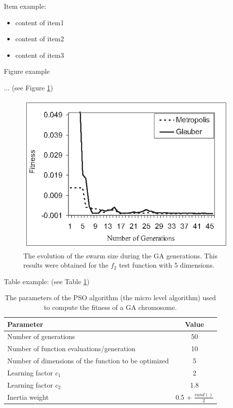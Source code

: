 \documentclass[runningheads,a4paper,11pt]{report}
\begin{document}
Item example: 

\begin{itemize}
	\item content of item1
 	\item content of item2
 	\item content of item3
\end{itemize}



Figure example 

$\ldots$ (see Figure \ref{swarmsize})

\begin{figure}[htbp]
	\centerline{\includegraphics{Fig/FitEvol.eps}}  
	\caption{The evolution of the swarm size during the GA generations. This results were obtained for the $f_2$ test function with 5 dimensions.}
	\label{swarmsize}
\end{figure}


Table example: (see Table \ref{tab3PSO})


\begin{table}[htbp]
	\caption{The parameters of the PSO algorithm (the micro level algorithm) used to compute the fitness of a GA chromosome.}
	\label{tab3PSO}
		\begin{center}
			\begin{tabular}{p{220pt}c}

				\textbf{Parameter}& \textbf{Value} \\
				\hline\hline
 				Number of generations& 50 \\
 				Number of function evaluations/generation& 10 \\
 				Number of dimensions of the function to be optimized& 5 \\
 				Learning factor $c_{1}$& 2 \\
 				Learning factor $c_{2}$ & 1.8\\
 				Inertia weight& 0.5 + $\frac{rand()}{2}$\\
		
			\end{tabular}
		\end{center}
\end{table}
\end{document}
